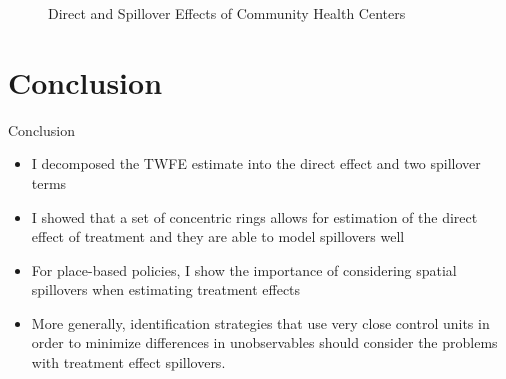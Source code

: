 \documentclass[aspectratio=169,t]{beamer}
\begin{document}
\begin{frame}
    \begin{figure}[tb!]
        \caption{Direct and Spillover Effects of Community Health Centers}
        \begin{center}
        \end{center}
    \end{figure}
\end{frame}

\section{Conclusion}

\begin{frame}{Conclusion}
    \begin{itemize}
        \item I decomposed the TWFE estimate into the direct effect and two spillover terms
        
        \item I showed that a set of concentric rings allows for estimation of the direct effect of treatment and they are able to model spillovers well
        
        \item For place-based policies, I show the importance of considering spatial spillovers when estimating treatment effects
        
        \item More generally, identification strategies that use very close control units in order to minimize differences in unobservables should consider the problems with treatment effect spillovers.
    \end{itemize}
\end{frame}
\end{document}
